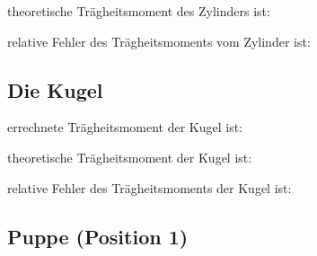 \justifying theoretische Trägheitsmoment des Zylinders ist:


\justifying relative Fehler des Trägheitsmoments vom Zylinder ist:


\subsection{Die Kugel}\justifying %

\justifying errechnete Trägheitsmoment der Kugel ist:


\justifying theoretische Trägheitsmoment der Kugel ist:


\justifying relative Fehler des Trägheitsmoments der Kugel ist:


\subsection{Puppe (Position 1)}\justifying %

